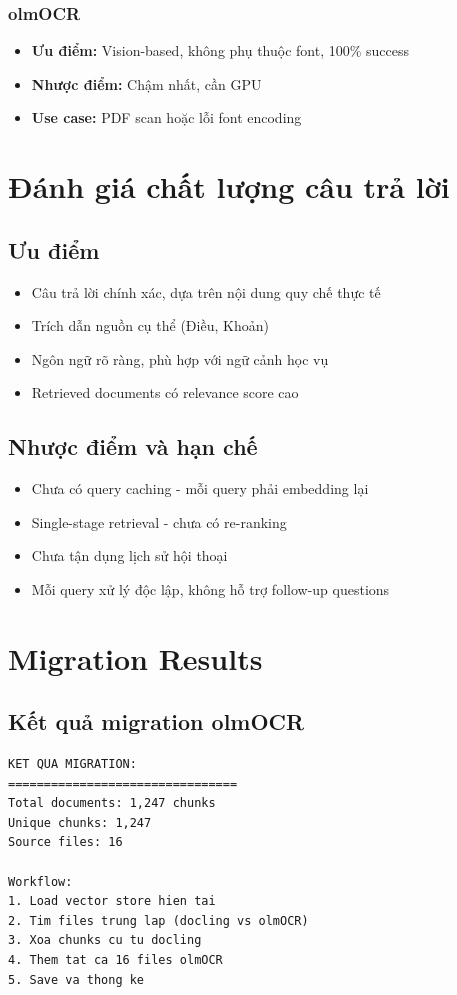 \documentclass[../DoAn.tex]{subfiles}
\begin{document}
\subsubsection{olmOCR}
\begin{itemize}
    \item \textbf{Ưu điểm:} Vision-based, không phụ thuộc font, 100\% success
    \item \textbf{Nhược điểm:} Chậm nhất, cần GPU
    \item \textbf{Use case:} PDF scan hoặc lỗi font encoding
\end{itemize}

\section{Đánh giá chất lượng câu trả lời}

\subsection{Ưu điểm}
\begin{itemize}
    \item Câu trả lời chính xác, dựa trên nội dung quy chế thực tế
    \item Trích dẫn nguồn cụ thể (Điều, Khoản)
    \item Ngôn ngữ rõ ràng, phù hợp với ngữ cảnh học vụ
    \item Retrieved documents có relevance score cao
\end{itemize}

\subsection{Nhược điểm và hạn chế}
\begin{itemize}
    \item Chưa có query caching - mỗi query phải embedding lại
    \item Single-stage retrieval - chưa có re-ranking
    \item Chưa tận dụng lịch sử hội thoại
    \item Mỗi query xử lý độc lập, không hỗ trợ follow-up questions
\end{itemize}

\section{Migration Results}

\subsection{Kết quả migration olmOCR}
\begin{verbatim}
KET QUA MIGRATION:
================================
Total documents: 1,247 chunks
Unique chunks: 1,247
Source files: 16

Workflow:
1. Load vector store hien tai
2. Tim files trung lap (docling vs olmOCR)
3. Xoa chunks cu tu docling
4. Them tat ca 16 files olmOCR
5. Save va thong ke
\end{verbatim}
\end{document}
